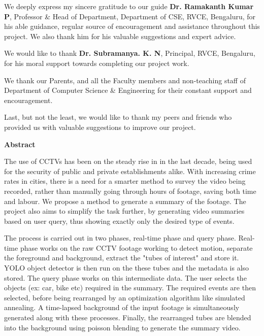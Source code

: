 We deeply express my sincere gratitude to our guide
\textbf{Dr. Ramakanth Kumar P}, Professor \& Head of Department,
Department of CSE, RVCE, Bengaluru, for his able guidance, regular source
of encouragement and assistance throughout this project. We also thank him for
his valuable suggestions and expert advice. \bigskip

We would like to thank \textbf{Dr. Subramanya. K. N}, Principal, RVCE,
Bengaluru, for his moral support towards completing our project work.\bigskip

We thank our Parents, and all the Faculty members and non-teaching staff of
Department of Computer Science \& Engineering for their constant support and
encouragement.\bigskip

Last, but not the least, we would like to thank my peers and friends who
provided us with valuable suggestions to improve our project.

\pagebreak

\begin{center}
	\huge\bfseries Abstract
\end{center}

\bigskip
\normalsize

\justify The use of CCTVs has been on the steady rise in in the last decade,
being used for the security of public and private establishments alike.
With increasing crime rates in cities, there is a need for a smarter method
to survey the video being recorded, rather than manually going through hours
of footage, saving both time and labour. We propose a method to generate a
summary of the footage. The project also aims to simplify the task further,
by generating video summaries based on user query, thus showing exactly only
the desired type of events.

\justify The process is carried out in two phases, real-time phase and query
phase. Real-time phase works on the raw CCTV footage working to detect
motion, separate the foreground and background, extract the "tubes of
interest" and store it. YOLO object detector is then run on the these tubes
and the metadata is also stored. The query phase works on this intermediate
data. The user selects the objects (ex: car, bike etc) required in the
summary. The required events are then selected, before being rearranged by
an optimization algorithm like simulated annealing. A time-lapsed background of
the input footage is simultaneously generated along with these processes.
Finally, the rearranged tubes are blended into the background using poisson
blending to generate the summary video.

